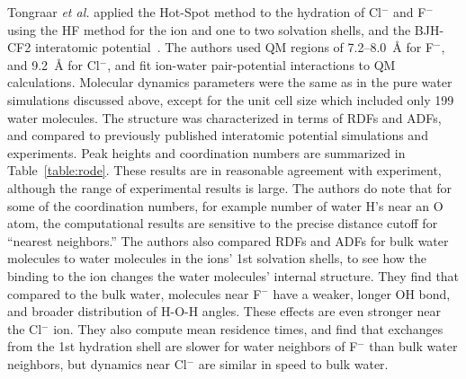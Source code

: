 \documentclass[11pt]{revtex4}
\begin{document}
Tongraar {\it et al.} applied the Hot-Spot method to the
hydration of Cl$^-$ and F$^-$ using the HF method for the
ion and one to two solvation shells, and the BJH-CF2 interatomic
potential~\cite{tongraar_phys_chem_chem_phys_2003a,tongraar_chem_phys_lett_2005a}.
The authors used QM regions of 7.2--8.0~{\AA} for F$^-$, and 9.2~{\AA} for
Cl$^-$, and fit ion-water pair-potential interactions to QM calculations.
Molecular dynamics parameters were the same as in the pure water
simulations discussed above, except for the unit cell size which included
only 199 water molecules.  The structure was characterized in terms of
RDFs and ADFs, and compared to previously published interatomic potential
simulations and experiments.  Peak heights and coordination numbers are
summarized in Table~\ref{table:rode}.  These results are in reasonable
agreement with experiment, although the range of experimental results
is large.  The authors do note that for some of the coordination numbers,
for example number of water H's near an O atom, the computational results
are sensitive to the precise distance cutoff for ``nearest neighbors.''
The authors also compared RDFs and ADFs for bulk water molecules to water
molecules in the ions' 1st solvation shells, to see how the binding to
the ion changes the water molecules' internal structure.   They find that
compared to the bulk water, molecules near F$^-$ have a weaker, longer OH
bond, and broader distribution of H-O-H angles.  These effects are even
stronger near the Cl$^-$ ion.  They also compute mean residence times,
and find that exchanges from the 1st hydration shell are slower for water
neighbors of F$^-$ than bulk water neighbors, but dynamics near Cl$^-$
are similar in speed to bulk water.


 
\end{document}
